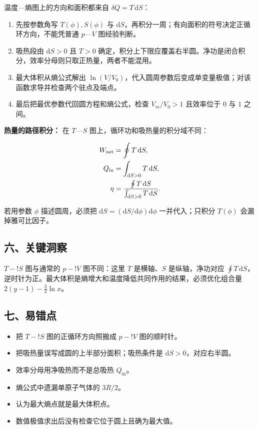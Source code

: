 \documentclass[12pt,a4paper,UTF8]{ctexart}
\newcommand{\tightlist}{\setlength{\itemsep}{0pt}\setlength{\parskip}{0pt}}
\begin{document}
温度---熵图上的方向和面积都来自 \(\delta Q=T\,\mathrm dS\)：

\begin{enumerate}
\def\labelenumi{\arabic{enumi}.}
\tightlist
\item
  先按参数角写 \(T(\phi),S(\phi)\) 与
  \(\mathrm dS\)，再积分一周；有向面积的符号决定正循环方向，不能凭普通
  \(p\)---\(V\) 图经验判断。
\item
  吸热段由 \(\mathrm dS>0\) 且 \(T>0\)
  确定，积分上下限应覆盖右半圆。净功是闭合积分，效率分母则只取正热量，两者不能混用。
\item
  最大体积从熵公式解出
  \(\ln(V/V_0)\)，代入圆周参数后变成单变量极值；对该函数求导并检查两个驻点及端点。
\item
  最后把最优参数代回圆方程和熵公式，检查 \(V_m/V_0>1\) 且效率位于 \(0\)
  与 \(1\) 之间。
\end{enumerate}

\textbf{热量的路径积分：} 在 \(T\)---\(S\)
图上，循环功和吸热量的积分域不同：

\[\begin{aligned}
W_{\rm net}&=\oint T\,\mathrm dS,\\
Q_{\rm in}&=\int_{\mathrm dS>0}T\,\mathrm dS,\\
\eta&=\frac{\oint T\,\mathrm dS}
{\int_{\mathrm dS>0}T\,\mathrm dS}.
\end{aligned}\]

若用参数 \(\phi\) 描述圆周，必须把
\(\mathrm dS=(\mathrm dS/\mathrm d\phi)\mathrm d\phi\) 一并代入；只积分
\(T(\phi)\) 会漏掉雅可比因子。

\subsection{六、关键洞察}\label{ux516dux5173ux952eux6d1eux5bdf-6}

\(T\!-!S\) 图与通常的 \(p\!-!V\) 图不同：这里 \(T\) 是横轴、\(S\)
是纵轴，净功对应
\(\oint T\,\mathrm dS\)，逆时针为正。最大体积是熵增大和温度降低共同作用的结果，必须优化组合量
\(2(y-1)-\frac32\ln x\)。

\subsection{七、易错点}\label{ux4e03ux6613ux9519ux70b9-6}

\begin{itemize}
\tightlist
\item
  把 \(T\!-!S\) 图的正循环方向照搬成 \(p\!-!V\) 图的顺时针。
\item
  把吸热量误写成圆的上半部分面积；吸热条件是
  \(\mathrm dS>0\)，对应右半圆。
\item
  效率分母用净吸热而不是总吸热 \(Q_{\mathrm{in}}\)。
\item
  熵公式中遗漏单原子气体的 \(3R/2\)。
\item
  认为最大熵点就是最大体积点。
\item
  数值极值求出后没有检查它位于圆上且确为最大值。
\end{itemize}
\end{document}
